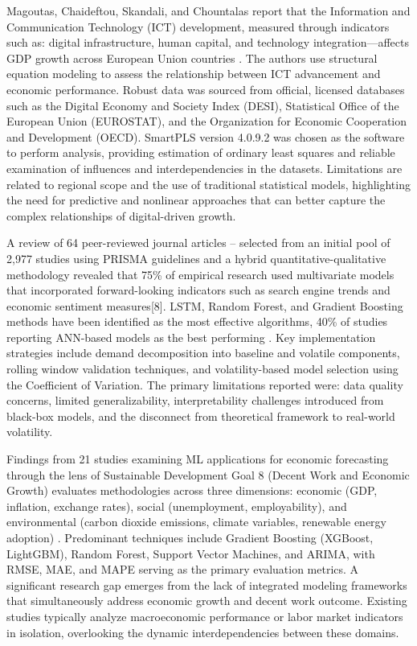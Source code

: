\documentclass[12pt]{article}
\begin{document}
        Magoutas, Chaideftou, Skandali, and Chountalas report that the Information and Communication Technology (ICT) development, measured through indicators such as: digital infrastructure, human capital, and technology integration—affects GDP growth across European Union countries \cite{magoutas2024}. The authors use structural equation modeling to assess the relationship between ICT advancement and economic performance. Robust data was sourced from official, licensed databases such as the Digital Economy and Society Index (DESI), Statistical Office of the European Union (EUROSTAT), and the Organization for Economic Cooperation and Development (OECD). SmartPLS version 4.0.9.2 was chosen as the software to perform analysis, providing estimation of ordinary least squares and reliable examination of influences and interdependencies in the datasets. Limitations are related to regional scope and the use of traditional statistical models, highlighting the need for predictive and nonlinear approaches that can better capture the complex relationships of digital-driven growth.
        
        A review of 64 peer-reviewed journal articles -- selected from an initial pool of 2,977 studies using PRISMA guidelines and a hybrid quantitative-qualitative methodology revealed that 75\% of empirical research used multivariate models that incorporated forward-looking indicators such as search engine trends and economic sentiment measures[8]. LSTM, Random Forest, and Gradient Boosting methods have been identified as the most effective algorithms, 40\% of studies reporting ANN-based models as the best performing \cite{ELBATAL2025101481}. Key implementation strategies include demand decomposition into baseline and volatile components, rolling window validation techniques, and volatility-based model selection using the Coefficient of Variation. The primary limitations reported were: data quality concerns, limited generalizability, interpretability challenges introduced from black-box models, and the disconnect from theoretical framework to real-world volatility.

        Findings from 21 studies examining ML applications for economic forecasting through the lens of Sustainable Development Goal 8 (Decent Work and Economic Growth) evaluates methodologies across three dimensions:  economic (GDP, inflation, exchange rates), social (unemployment, employability), and environmental (carbon dioxide emissions, climate variables, renewable energy adoption) \cite{Shaker10485171}. Predominant techniques include Gradient Boosting (XGBoost, LightGBM), Random Forest, Support Vector Machines, and ARIMA, with RMSE, MAE, and MAPE serving as the primary evaluation metrics. A significant research gap emerges from the lack of integrated modeling frameworks that simultaneously address economic growth and decent work outcome. Existing studies typically analyze macroeconomic performance or labor market indicators in isolation, overlooking the dynamic interdependencies between these domains.
        
\end{document}
